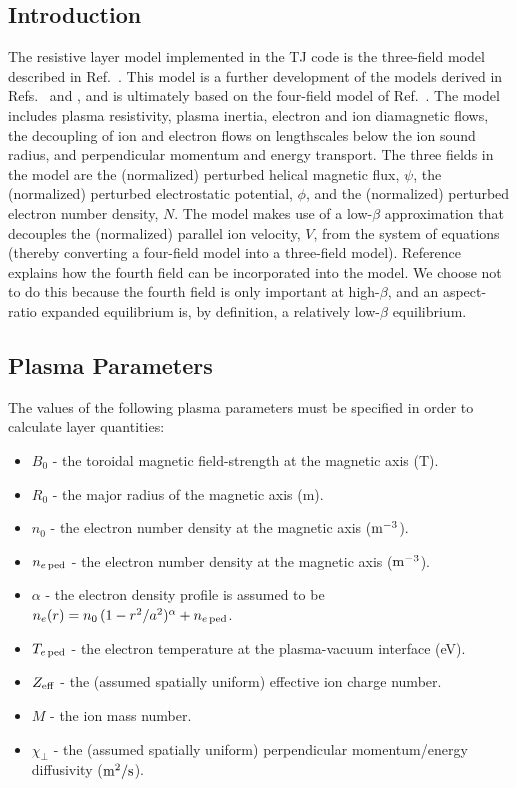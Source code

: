 \documentclass[12pt,prb,aps]{revtex4-1}
\begin{document}
\subsection{Introduction}
 The resistive layer model implemented in the TJ code is the three-field model described in Ref.~. This model is a further development of
 the models derived in Refs.~ and , and is ultimately based on the four-field model of Ref.~. 
 The model includes plasma resistivity, plasma inertia, electron and ion diamagnetic flows, the decoupling of ion and electron flows on lengthscales below the ion sound
 radius, and perpendicular momentum and energy transport. The three fields in the model are the (normalized) perturbed helical magnetic flux, $\psi$, the (normalized)
 perturbed electrostatic potential, $\phi$, and the (normalized) perturbed electron number density, $N$. The model makes use of a low-$\beta$
 approximation that decouples the (normalized) parallel ion velocity, $V$,  from the system of equations (thereby converting a four-field model into
 a three-field model). Reference~ explains how the fourth field can be incorporated into the model. We choose not to do this
 because the fourth field is only important at high-$\beta$, and an aspect-ratio expanded equilibrium is, by definition, a relatively low-$\beta$
 equilibrium. 

\subsection{Plasma Parameters}\label{ppara}
The values of the following plasma parameters must be specified in order to calculate layer quantities:
\begin{itemize}
\item $B_0$ - the toroidal magnetic field-strength at the magnetic axis (T).
\item $R_0$ - the major radius of the magnetic axis  (m).
\item $n_0$ - the  electron number density at the magnetic axis (${\rm m}^{-3}$).
\item $n_{e\,{\rm ped}}$ - the  electron number density at the magnetic axis (${\rm m}^{-3}$).
\item $\alpha$ - the electron density profile is assumed to be $n_e(r)=n_0\,(1-r^2/a^2)^\alpha + n_{e\,\rm ped}$.
\item $T_{e\,{\rm ped}}$ - the electron temperature at the plasma-vacuum interface (eV).
\item $Z_{\rm eff}$  - the (assumed spatially uniform) effective ion charge number.
\item $M$ - the ion mass number.
\item $\chi_\perp$ - the (assumed spatially uniform) perpendicular momentum/energy diffusivity (${\rm m}^2/{\rm s}$).
\end{itemize}
\end{document}

